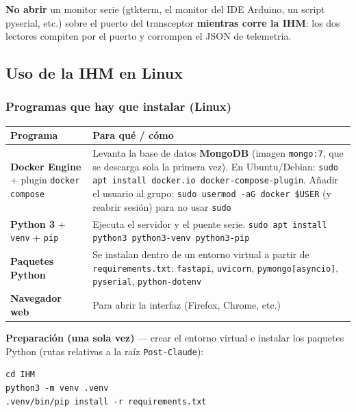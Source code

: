 \documentclass[12pt,a4paper]{article}
\newcommand{\file}[1]{\texttt{#1}}
\begin{document}
\begin{warningbox}
  \textbf{No abrir} un monitor serie (gtkterm, el monitor del IDE Arduino, un script
  pyserial, etc.) sobre el puerto del transceptor \textbf{mientras corre la IHM}: los
  dos lectores compiten por el puerto y corrompen el JSON de telemetr\'ia.
\end{warningbox}

\subsection{Uso de la IHM en Linux}

\subsubsection{Programas que hay que instalar (Linux)}

\begin{longtable}{L{4.2cm} L{8.8cm}}
  \toprule
  \textcolor{tableheadfg}{\textbf{Programa}} &
  \textcolor{tableheadfg}{\textbf{Para qu\'e / c\'omo}} \\
  \midrule
  \endhead
  \bottomrule
  \endfoot
  \textbf{Docker Engine} + plugin \texttt{docker compose} & Levanta la base de datos
    \textbf{MongoDB} (imagen \texttt{mongo:7}, que se descarga sola la primera vez).
    En Ubuntu/Debian: \texttt{sudo apt install docker.io docker-compose-plugin}.
    A\~nadir el usuario al grupo: \texttt{sudo usermod -aG docker \$USER} (y reabrir
    sesi\'on) para no usar \texttt{sudo} \\[3pt]
  \textbf{Python 3} + \texttt{venv} + \texttt{pip} & Ejecuta el servidor y el puente
    serie. \texttt{sudo apt install python3 python3-venv python3-pip} \\[3pt]
  \textbf{Paquetes Python} & Se instalan dentro de un entorno virtual a partir de
    \file{requirements.txt}: \texttt{fastapi}, \texttt{uvicorn},
    \texttt{pymongo[asyncio]}, \texttt{pyserial}, \texttt{python-dotenv} \\[3pt]
  \textbf{Navegador web} & Para abrir la interfaz (Firefox, Chrome, etc.) \\
\end{longtable}

\textbf{Preparaci\'on (una sola vez)} --- crear el entorno virtual e instalar los
paquetes Python (rutas relativas a la ra\'iz \file{Post-Claude}):

\begin{lstlisting}[style=shell, caption={Instalacion inicial de la IHM en Linux}]
cd IHM
python3 -m venv .venv
.venv/bin/pip install -r requirements.txt
\end{lstlisting}
\end{document}
